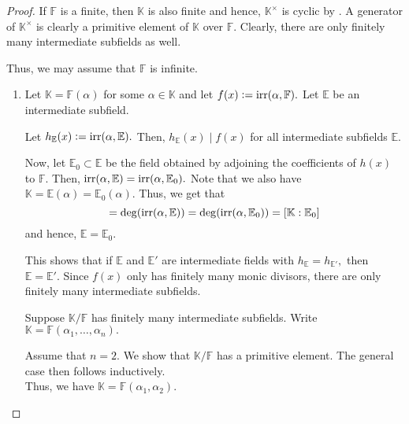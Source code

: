 \pet*\label{thm:pet2}
\begin{flushright}\hyperref[thm:pet]{\upsym}\end{flushright}
\begin{proof}
    If $\mathbb{F}$ is a finite, then $\mathbb{K}$ is also finite and hence, $\mathbb{K}^\times$ is cyclic by . A generator of $\mathbb{K}^\times$ is clearly a primitive element of $\mathbb{K}$ over $\mathbb{F}.$ Clearly, there are only finitely many intermediate subfields as well. 

    Thus, we may assume that $\mathbb{F}$ is infinite.
    \begin{enumerate}[leftmargin=*]
        \item \forward Let $\mathbb{K} = \mathbb{F}(\alpha)$ for some $\alpha \in \mathbb{K}$ and let $f(x) \vcentcolon= \operatorname{irr}(\alpha, \mathbb{F}).$ Let $\mathbb{E}$ be an intermediate subfield. 

        Let $h_{\mathbb{E}}(x) \vcentcolon= \operatorname{irr}(\alpha, \mathbb{E}).$ Then, $h_{\mathbb{E}}(x) \mid f(x)$ for all intermediate subfields $\mathbb{E}.$

        Now, let $\mathbb{E}_0 \subset \mathbb{E}$ be the field obtained by adjoining the coefficients of $h(x)$ to $\mathbb{F}.$ Then, $\operatorname{irr}(\alpha, \mathbb{E}) = \operatorname{irr}(\alpha, \mathbb{E}_{0}).$ Note that we also have $\mathbb{K} = \mathbb{E}(\alpha) = \mathbb{E}_0(\alpha).$ Thus, we get that
        \begin{equation*} 
            [\mathbb{K} : \mathbb{E}] = \deg(\irr(\alpha, \mathbb{E})) = \deg(\irr(\alpha, \mathbb{E}_0)) = [\mathbb{K} : \mathbb{E}_0]
        \end{equation*}
        and hence, $\mathbb{E} = \mathbb{E}_0.$

        This shows that if $\mathbb{E}$ and $\mathbb{E}'$ are intermediate fields with $h_{\mathbb{E}} = h_{\mathbb{E}'},$ then $\mathbb{E} = \mathbb{E}'.$ Since $f(x)$ only has finitely many monic divisors, there are only finitely many intermediate subfields.

        \backward Suppose $\mathbb{K}/\mathbb{F}$ has finitely many intermediate subfields. Write $\mathbb{K} = \mathbb{F}(\alpha_1, \ldots, \alpha_n).$

        Assume that $n = 2.$ We show that $\mathbb{K}/\mathbb{F}$ has a primitive element. The general case then follows inductively. \\
        Thus, we have $\mathbb{K} = \mathbb{F}(\alpha_1, \alpha_2).$ 


\end{enumerate}
\end{proof}
